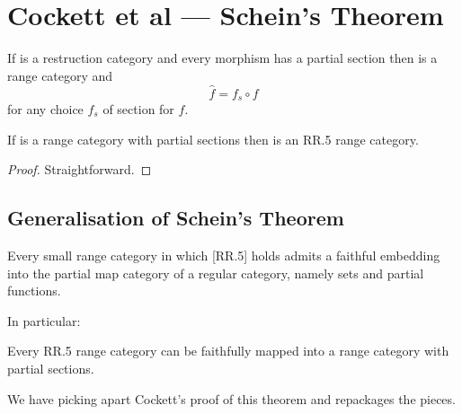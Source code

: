
\section{Cockett et al --- Schein's Theorem}
\begin{lemma}[Cockett et al]
If \catcw is a restruction category
and every morphism has a partial section then
\catcw is a range category and
\[\widehat{f} = f_s \circ f\]
for any choice $f_s$ of section for $f$.
\end{lemma}

\begin{lemma}[Cockett et al]
If \catcw is a range category with partial sections then \catcw is an RR.5 range category.
\end{lemma}
\begin{proof}
Straightforward.
\end{proof}

\subsection{Generalisation of Schein's Theorem}
\begin{theorem} 
Every small range category in
which [RR.5] holds admits a faithful embedding into the partial
map category of a regular category, namely sets and partial functions.
\end{theorem}

In particular:
\begin{corollary}
\label{scheincorollary}
Every RR.5 range category can be faithfully mapped into a range category with partial sections.
\end{corollary}

We have picking apart Cockett's proof of this theorem
and repackages  the pieces.  